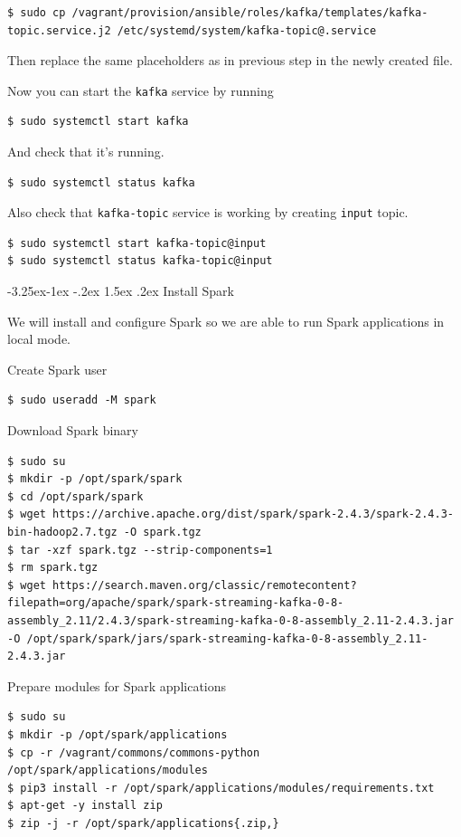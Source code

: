 \documentclass[a4paper]{article} %
\makeatletter
\renewcommand{\normalsize}{\fontsize{12}{15}\selectfont\color{textcolor}}
\renewcommand\subsubsection{\@startsection{subsubsection}{3}{\z@}%
                   {-3.25ex\@plus -1ex \@minus -.2ex}%
                   {1.5ex \@plus .2ex}%
                   {\normalfont\normalsize\sffamily\bfseries\color{projectcolor}}}
\makeatother
\begin{document}
\begin{lstlisting}
$ sudo cp /vagrant/provision/ansible/roles/kafka/templates/kafka-topic.service.j2 /etc/systemd/system/kafka-topic@.service
\end{lstlisting}

Then replace the same placeholders as in previous step in the newly created file.

Now you can start the \texttt{kafka} service by running

\begin{lstlisting}
$ sudo systemctl start kafka
\end{lstlisting}

And check that it's running.

\begin{lstlisting}
$ sudo systemctl status kafka
\end{lstlisting}

Also check that \texttt{kafka-topic} service is working by creating \texttt{input} topic.

\begin{lstlisting}
$ sudo systemctl start kafka-topic@input
$ sudo systemctl status kafka-topic@input
\end{lstlisting}


\subsubsection{Install Spark}

We will install and configure Spark so we are able to run Spark applications in local mode.

Create Spark user
\begin{lstlisting}
$ sudo useradd -M spark
\end{lstlisting}

Download Spark binary
\begin{lstlisting}
$ sudo su
$ mkdir -p /opt/spark/spark
$ cd /opt/spark/spark
$ wget https://archive.apache.org/dist/spark/spark-2.4.3/spark-2.4.3-bin-hadoop2.7.tgz -O spark.tgz
$ tar -xzf spark.tgz --strip-components=1
$ rm spark.tgz
$ wget https://search.maven.org/classic/remotecontent?filepath=org/apache/spark/spark-streaming-kafka-0-8-assembly_2.11/2.4.3/spark-streaming-kafka-0-8-assembly_2.11-2.4.3.jar -O /opt/spark/spark/jars/spark-streaming-kafka-0-8-assembly_2.11-2.4.3.jar
\end{lstlisting}

Prepare modules for Spark applications
\begin{lstlisting}
$ sudo su
$ mkdir -p /opt/spark/applications
$ cp -r /vagrant/commons/commons-python /opt/spark/applications/modules
$ pip3 install -r /opt/spark/applications/modules/requirements.txt
$ apt-get -y install zip
$ zip -j -r /opt/spark/applications{.zip,}
\end{lstlisting}
\end{document}
